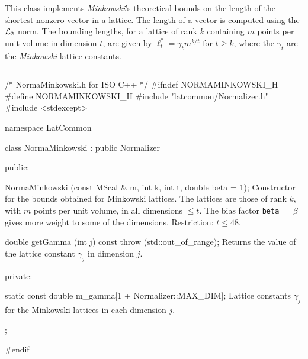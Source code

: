 % 
% 
% 
% 


 This class implements {\em Minkowski\/}'s theoretical bounds on the length of
 the shortest nonzero vector in a lattice. The length of a vector is
 computed using the ${\cal L}_2$ norm. The bounding lengths, for a lattice
 of rank $k$   containing $m$ points per unit volume in dimension $t$, are
 given by $\ell_t^* = \gamma_t m^{k/t}$ for $t \ge k$, where the $\gamma_t$
 are the {\em Minkowski} lattice constants.

\bigskip\hrule
\code \hide
/* NormaMinkowski.h for ISO C++ */
#ifndef NORMAMINKOWSKI_H
#define NORMAMINKOWSKI_H
\endhide
#include "latcommon/Normalizer.h"
#include <stdexcept>


namespace LatCommon {

class NormaMinkowski : public Normalizer {
public:

   NormaMinkowski (const MScal & m, int k, int t, double beta = 1);
\endcode
 \tabb Constructor for the bounds obtained for Minkowski lattices. The 
   lattices are those of rank $k$,
   with $m$ points per unit volume, in all dimensions  $\le t$.
   The bias factor \texttt{beta} $= \beta$ gives more weight to some of the
   dimensions. Restriction: $t \le 48$.
  \endtabb
\code

   double getGamma (int j) const throw (std::out_of_range);
\endcode
 \tabb 
   Returns the value of the lattice constant $\gamma_j$ in dimension  $j$.
 \endtabb
\ifdetailed
\code


private:

   static const double m_gamma[1 + Normalizer::MAX_DIM];
\endcode
 \tabb 
  Lattice constants $\gamma_j$ for the Minkowski lattices in each
  dimension $j$.
  \endtabb
\fi
\code

};

}
\hide
#endif
\endhide
\endcode
